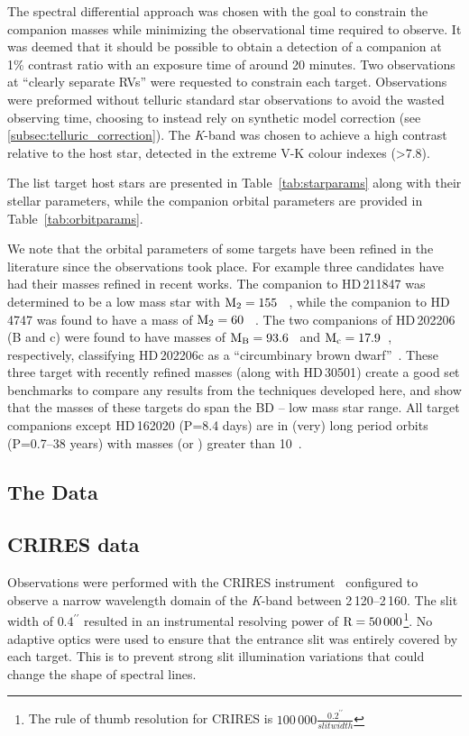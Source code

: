 The spectral differential approach was chosen with the goal to constrain the companion masses while minimizing the observational time required to observe. It was deemed that it should be possible to obtain a detection of a companion at 1\% contrast ratio with an exposure time of around 20 minutes. Two observations at ``clearly separate RVs'' were requested to constrain each target. Observations were preformed without telluric standard star observations to avoid the wasted observing time, choosing to instead rely on synthetic model correction (see \ref{subsec:telluric_correction}). The \textit{K}-band was chosen to achieve a high contrast relative to the host star, detected in the extreme V-K colour indexes (>7.8).

The list target host stars are presented in Table~\ref{tab:starparams} along with their stellar parameters, while the companion orbital parameters are provided in Table~\ref{tab:orbitparams}.

We note that the orbital parameters of some targets have been refined in the literature since the observations took place. For example three candidates have had their masses refined in recent works. The companion to {HD\,211847} was determined to be a low mass star with \(\rm M_2=155~\)\Mjup{}~\citep{moutou_eccentricity_2017}, while the companion to {HD\,4747} was found to have a mass of \(\rm M_2=60~\)\Mjup{}~\citep{crepp_trends_2016}. The two companions of {HD\,202206} (B and c) were found to have masses of \(\rm M_B =93.6\)~\Mjup{} and \(\rm M_c = 17.9\)~\Mjup{}, respectively, classifying {HD\,202206}c as a ``circumbinary brown dwarf''~\citep{benedict_hd_2017}. These three target with recently refined masses (along with {HD\,30501}) create a good set benchmarks to compare any results from the techniques developed here, and show that the masses of these targets do span the BD -- low mass star range. All target companions except {HD\,162020} (P=8.4 days) are in (very) long period orbits (P=0.7--38 years) with masses (or \mtwosini{}) greater than 10~\Mjup{}.




\subsection{The Data}

\subsection{CRIRES data}
\label{subsec:CRIRES}
Observations were performed with the {CRIRES} instrument~\citep{kaeufl_crires_2004} configured to observe a narrow wavelength domain of the \emph{K}-band between 2\,120--2\,160\nm{}. The slit width of \(0.4^{\prime\prime}\) resulted in an instrumental resolving power of \(\rm R=50\,000\)\footnote{The rule of thumb resolution for {CRIRES} is \(100\,000\frac{0.2^{\prime\prime}}{slit width}\)}. No adaptive optics were used to ensure that the entrance slit was entirely covered by each target. This is to prevent strong slit illumination variations that could change the shape of spectral lines.

